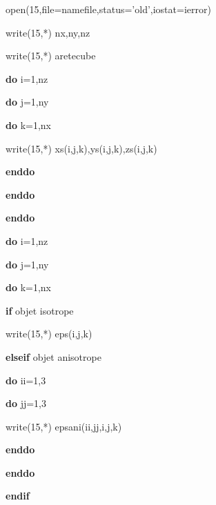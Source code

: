 \hspace{5mm} open(15,file=namefile,status='old',iostat=ierror)

\hspace{5mm} write(15,*) nx,ny,nz

\hspace{5mm} write(15,*) aretecube


\hspace{5mm} {\bf do} i=1,nz

  \hspace{10mm} {\bf do} j=1,ny

 \hspace{15mm} {\bf do} k=1,nx
  

      \hspace{20mm}  write(15,*) xs(i,j,k),ys(i,j,k),zs(i,j,k)     
         
   \hspace{15mm} {\bf enddo}

  \hspace{10mm} {\bf enddo}

 \hspace{5mm} {\bf enddo}

\hspace{5mm} {\bf do} i=1,nz

  \hspace{10mm} {\bf do} j=1,ny

 \hspace{15mm} {\bf do} k=1,nx

 \hspace{20mm} {\bf if}  objet isotrope 

         \hspace{25mm}    write(15,*)  eps(i,j,k)
                    
    \hspace{20mm} {\bf elseif}  objet anisotrope

       \hspace{25mm}  {\bf do} ii=1,3
 
              \hspace{30mm}  {\bf do} jj=1,3

                \hspace{35mm} write(15,*) epsani(ii,jj,i,j,k)

   \hspace{30mm} {\bf enddo}

  \hspace{25mm} {\bf enddo}

       \hspace{20mm} {\bf endif}

